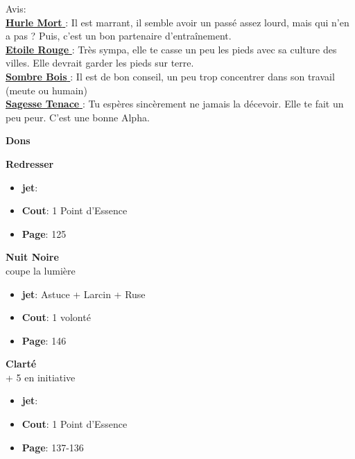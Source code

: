 \documentclass[oneside,12pt]{book}
\newcommand\don[5]{
\textbf{#1} \\
#2
\begin{itemize}
\item{ \textbf{jet}: #3}
\item{ \textbf{Cout}: #4}
\item{ \textbf{Page}: #5}
\end{itemize}
\vspace{0.5cm}
}
\newcommand{\Lynn}{\textbf{Etoile Rouge} }
\newcommand{\Jessica}{\textbf{Sagesse Tenace} }
\newcommand{\Peter}{\textbf{Hurle Mort} }
\newcommand{\Leonard}{\textbf{Sombre Bois} }
\begin{document}
\begin{flushleft}
\begin{description}
{Avis:\\
\underline{\Peter} : Il est marrant, il semble avoir un passé assez lourd, mais qui n'en a pas ? Puis, c'est un bon partenaire d’entraînement. \\
\underline{\Lynn}: Très sympa, elle te casse un peu les pieds avec sa culture des villes. Elle devrait garder les pieds sur terre.\\
\underline{\Leonard} : Il est de bon conseil, un peu trop concentrer dans son travail (meute ou humain)\\
\underline{\Jessica}: Tu espères sincèrement ne jamais la décevoir. Elle te fait un peu peur. C'est une bonne Alpha.\\
}
\end{description}
\clearpage
\textbf{\large Dons} 
\vspace{0.5cm}


\don{Redresser}{}{}{1 Point d'Essence}{125}
\don{Nuit Noire}{coupe la lumière }{Astuce + Larcin + Ruse}{1 volonté}{146}
\don{Clarté}{+ 5 en initiative}{}{1 Point d'Essence}{137-136}

\clearpage

\end{flushleft}
\end{document}
